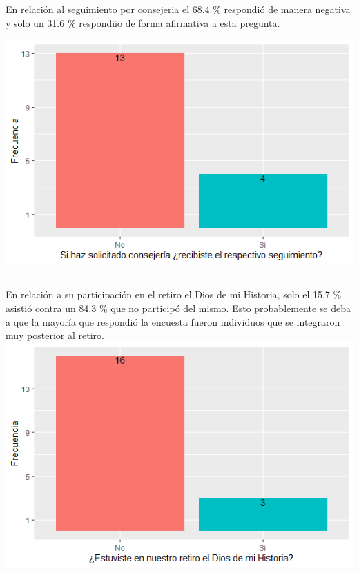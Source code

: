 \documentclass{beamer}
\begin{document}
\subsection{}
\begin{frame}{}
\vspace{-0.9\baselineskip}
\begin{tcolorbox}[colback=backframe_color,colframe=beamer_color,title=] 
En relación al seguimiento por consejeria el 68.4 \% respondió de manera negativa y solo un 31.6 \% respondiio de forma afirmativa a esta pregunta. 

\includegraphics[width=0.8\linewidth]{special_figures/Rplot08.png}
\end{tcolorbox}
\end{frame}

\subsection{}
\begin{frame}{}
\vspace{-0.9\baselineskip}
\begin{tcolorbox}[colback=backframe_color,colframe=beamer_color,title=] 
En relación a su participación en el retiro el Dios de mi Historia, solo el 15.7 \% asistió contra un 84.3 \% que no participó del mismo. Esto probablemente se deba a que la mayoría que respondió la encuesta fueron individuos que se integraron muy posterior al retiro.
\includegraphics[width=0.8\linewidth]{special_figures/Rplot09.png}
\end{tcolorbox}
\end{frame}
\end{document}
